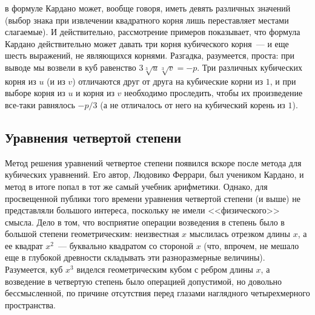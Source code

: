 \documentclass[a4paper,11pt]{scrartcl}
\theoremstyle{plain}
\theoremstyle{definition}
\begin{document}
\begin{itemize}
в формуле Кардано может, вообще говоря, иметь девять различных
значений (выбор знака при извлечении квадратного корня лишь
переставляет местами слагаемые).
И действительно, рассмотрение примеров показывает, что формула Кардано
действительно может давать три корня кубического корня~--- и еще шесть
выражений, не являющихся корнями.
Разгадка, разумеется, проста: при выводе мы возвели в куб равенство
$3\sqrt[3]{u}\sqrt[3]{v} = -p$.
Три различных кубических корня из $u$ (и из $v$) отличаются друг от
друга на кубические корни из $1$, и при выборе корня из $u$ и корня из
$v$ необходимо проследить, чтобы их произведение все-таки равнялось
$-p/3$ (а не отличалось от него на кубический корень из $1$).
\end{itemize}

\subsection{Уравнения четвертой степени}

Метод решения уравнений четвертое степени появился вскоре после метода
для кубических уравнений. Его автор, Людовико Феррари, был учеником
Кардано, и метод в итоге попал в тот же самый учебник арифметики.
Однако, для просвещенной публики того времени уравнения четвертой
степени (и выше) не представляли большого интереса, поскольку не имели
<<физического>> смысла.
Дело в том, что восприятие операции возведения в степень было в
большой степени геометрическим: неизвестная $x$ мыслилась отрезком
длины $x$, а ее квадрат $x^2$~--- буквально квадратом со стороной $x$
(что, впрочем, не мешало еще в глубокой древности складывать эти
разноразмерные величины). Разумеется, куб $x^3$ виделся геометрическим
кубом с ребром длины $x$, а возведение в четвертую степень было
операцией допустимой, но довольно бессмысленной, по причине отсутствия
перед глазами наглядного четырехмерного пространства.
\end{document}
